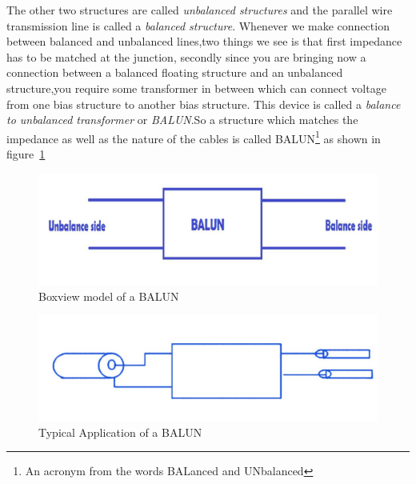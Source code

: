 The other two structures are called \emph{unbalanced structures} and the parallel wire transmission line is called a \emph{balanced structure}. Whenever we make connection between balanced and unbalanced lines,two things we see is that first impedance has to be matched at the junction, secondly since you are bringing now a connection between a balanced floating structure and an unbalanced structure,you require some transformer in between which can connect voltage from one bias structure to another bias structure. This device is called a \emph{balance to unbalanced transformer} or \emph{BALUN}.So a structure which matches the impedance as well as the nature of the cables is called BALUN\footnote{
An acronym from the words BALanced and UNbalanced
} as shown in figure~\ref{fig:balunImage}
\begin{figure}[h]
\centering
\includegraphics[width=1\linewidth]{graphics/balunImage}
\caption{Boxview model of a BALUN}
\label{fig:balunImage}
\end{figure}
\begin{figure}[h]
\centering
\includegraphics[width=1\linewidth]{graphics/balunTwo}
\caption{Typical Application of a BALUN}
\label{fig:balunTwo}
\end{figure}

